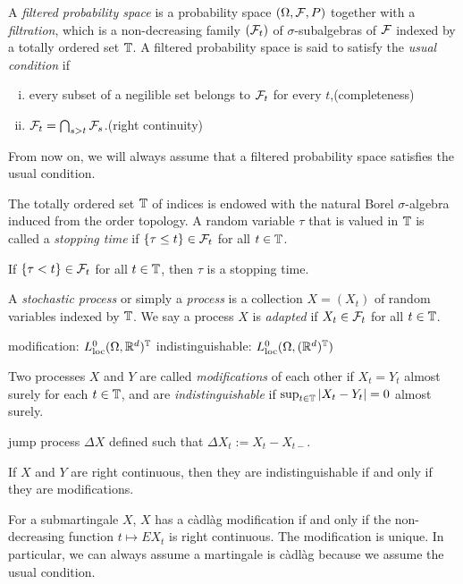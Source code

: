 \documentclass{../../large}
\newcommand{\cadlag}{c\`adl\`ag }
\begin{document}
\begin{prb}
A \emph{filtered probability space} is a probability space $(\Omega,\mathcal{F},P)$ together with a \emph{filtration}, which is a non-decreasing family $(\mathcal{F}_t)$ of $\sigma$-subalgebras of $\mathcal{F}$ indexed by a totally ordered set $\mathbb{T}$.
A filtered probability space is said to satisfy the \emph{usual condition} if
\begin{enumerate}[(i)]
\item every subset of a negilible set belongs to $\mathcal{F}_t$ for every $t$,\hfill(completeness)
\item $\mathcal{F}_t=\bigcap_{s>t}\mathcal{F}_s$.\hfill(right continuity)
\end{enumerate}
From now on, we will always assume that a filtered probability space satisfies the usual condition.

The totally ordered set $\mathbb{T}$ of indices is endowed with the natural Borel $\sigma$-algebra induced from the order topology.
A random variable $\tau$ that is valued in $\mathbb{T}$ is called a \emph{stopping time} if $\{\tau\le t\}\in\mathcal{F}_t$ for all $t\in\mathbb{T}$.

\begin{parts}
\item If $\{\tau<t\}\in\mathcal{F}_t$ for all $t\in\mathbb{T}$, then $\tau$ is a stopping time.
\end{parts}
\end{prb}


\begin{prb}
A \emph{stochastic process} or simply a \emph{process} is a collection $X=(X_t)$ of random variables indexed by $\mathbb{T}$.
We say a process $X$ is \emph{adapted} if $X_t\in\mathcal{F}_t$ for all $t\in\mathbb{T}$.

modification: $L^0_{\mathrm{loc}}(\Omega,\mathbb{R}^d)^{\mathbb{T}}$
indistinguishable: $L^0_{\mathrm{loc}}(\Omega,(\mathbb{R}^d)^{\mathbb{T}})$

Two processes $X$ and $Y$ are called \emph{modifications} of each other if $X_t=Y_t$ almost surely for each $t\in\mathbb{T}$, and are \emph{indistinguishable} if $\sup_{t\in\mathbb{T}}|X_t-Y_t|=0$ almost surely.

jump process $\Delta X$ defined such that $\Delta X_t:=X_t-X_{t-}$.
\begin{parts}
\item If $X$ and $Y$ are right continuous, then they are indistinguishable if and only if they are modifications.
\item For a submartingale $X$, $X$ has a \cadlag modification if and only if the non-decreasing function $t\mapsto EX_t$ is right continuous. The modification is unique. In particular, we can always assume a martingale is \cadlag because we assume the usual condition.
\end{parts}
\end{prb}
\end{document}
